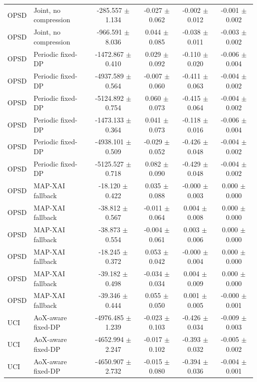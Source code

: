 \begin{tabular}{llcccc}
OPSD & Joint, no compression & -285.557 $\pm$ 1.134 & -0.027 $\pm$ 0.062 & -0.002 $\pm$ 0.012 & -0.001 $\pm$ 0.002 \\
OPSD & Joint, no compression & -966.591 $\pm$ 8.036 & 0.044 $\pm$ 0.085 & -0.038 $\pm$ 0.011 & -0.003 $\pm$ 0.002 \\
OPSD & Periodic fixed-DP & -1472.867 $\pm$ 0.410 & 0.029 $\pm$ 0.092 & -0.110 $\pm$ 0.020 & -0.006 $\pm$ 0.004 \\
OPSD & Periodic fixed-DP & -4937.589 $\pm$ 0.564 & -0.007 $\pm$ 0.060 & -0.411 $\pm$ 0.063 & -0.004 $\pm$ 0.002 \\
OPSD & Periodic fixed-DP & -5124.892 $\pm$ 0.754 & 0.060 $\pm$ 0.073 & -0.415 $\pm$ 0.064 & -0.004 $\pm$ 0.002 \\
OPSD & Periodic fixed-DP & -1473.133 $\pm$ 0.364 & 0.041 $\pm$ 0.073 & -0.118 $\pm$ 0.016 & -0.006 $\pm$ 0.004 \\
OPSD & Periodic fixed-DP & -4938.101 $\pm$ 0.509 & -0.029 $\pm$ 0.052 & -0.426 $\pm$ 0.048 & -0.004 $\pm$ 0.002 \\
OPSD & Periodic fixed-DP & -5125.527 $\pm$ 0.718 & 0.082 $\pm$ 0.090 & -0.429 $\pm$ 0.048 & -0.004 $\pm$ 0.002 \\
OPSD & MAP-XAI fallback & -18.120 $\pm$ 0.422 & 0.035 $\pm$ 0.088 & -0.000 $\pm$ 0.003 & 0.000 $\pm$ 0.000 \\
OPSD & MAP-XAI fallback & -38.812 $\pm$ 0.567 & -0.011 $\pm$ 0.064 & 0.004 $\pm$ 0.008 & 0.000 $\pm$ 0.000 \\
OPSD & MAP-XAI fallback & -38.873 $\pm$ 0.554 & -0.004 $\pm$ 0.061 & 0.003 $\pm$ 0.006 & 0.000 $\pm$ 0.000 \\
OPSD & MAP-XAI fallback & -18.245 $\pm$ 0.372 & 0.053 $\pm$ 0.042 & -0.000 $\pm$ 0.004 & 0.000 $\pm$ 0.000 \\
OPSD & MAP-XAI fallback & -39.182 $\pm$ 0.498 & -0.034 $\pm$ 0.034 & 0.004 $\pm$ 0.009 & 0.000 $\pm$ 0.000 \\
OPSD & MAP-XAI fallback & -39.346 $\pm$ 0.444 & 0.055 $\pm$ 0.050 & 0.001 $\pm$ 0.005 & -0.000 $\pm$ 0.001 \\
UCI & AoX-aware fixed-DP & -4976.485 $\pm$ 1.239 & -0.023 $\pm$ 0.103 & -0.426 $\pm$ 0.034 & -0.009 $\pm$ 0.003 \\
UCI & AoX-aware fixed-DP & -4652.994 $\pm$ 2.247 & -0.017 $\pm$ 0.102 & -0.393 $\pm$ 0.032 & -0.005 $\pm$ 0.002 \\
UCI & AoX-aware fixed-DP & -4650.907 $\pm$ 2.732 & -0.015 $\pm$ 0.080 & -0.394 $\pm$ 0.036 & -0.004 $\pm$ 0.001 \\

\end{tabular}
